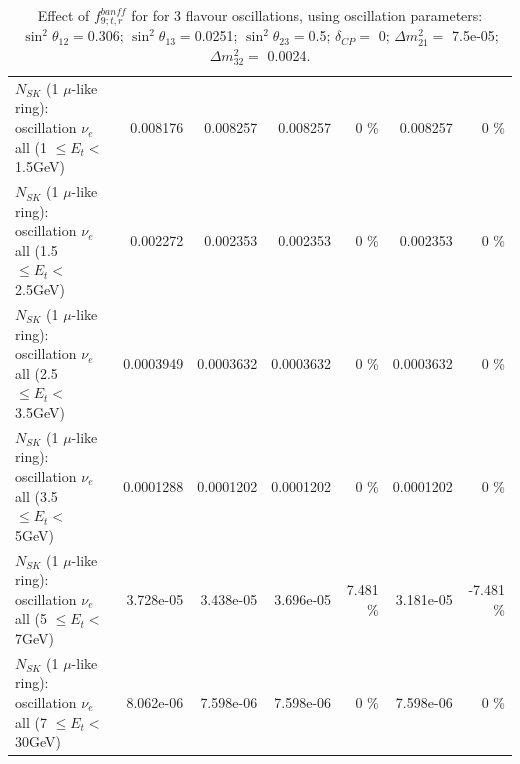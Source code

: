\begin{table}
\begin{tabular}{| l | r | r | r  r | r  r |}
$N_{SK}$ (1 $\mu$-like ring): oscillation $\nu_{e}$ all (1 $\leq E_{t} <$ 1.5GeV) &        0.008176 &        0.008257 &        0.008257 &        0 \%  &        0.008257 &        0 \%  \\ 
$N_{SK}$ (1 $\mu$-like ring): oscillation $\nu_{e}$ all (1.5 $\leq E_{t} <$ 2.5GeV) &        0.002272 &        0.002353 &        0.002353 &        0 \%  &        0.002353 &        0 \%  \\ 
$N_{SK}$ (1 $\mu$-like ring): oscillation $\nu_{e}$ all (2.5 $\leq E_{t} <$ 3.5GeV) &       0.0003949 &       0.0003632 &       0.0003632 &        0 \%  &       0.0003632 &        0 \%  \\ 
$N_{SK}$ (1 $\mu$-like ring): oscillation $\nu_{e}$ all (3.5 $\leq E_{t} <$ 5GeV) &       0.0001288 &       0.0001202 &       0.0001202 &        0 \%  &       0.0001202 &        0 \%  \\ 
 $N_{SK}$ (1 $\mu$-like ring): oscillation $\nu_{e}$ all (5 $\leq E_{t} <$ 7GeV) &       3.728e-05 &       3.438e-05 &       3.696e-05 &    7.481 \%  &       3.181e-05 &   -7.481 \%  \\ 
$N_{SK}$ (1 $\mu$-like ring): oscillation $\nu_{e}$ all (7 $\leq E_{t} <$ 30GeV) &       8.062e-06 &       7.598e-06 &       7.598e-06 &        0 \%  &       7.598e-06 &        0 \%  \\ 
\hline
\hline
\end{tabular}
\caption{ Effect of $f_{9; t, r}^{banff}$ for for 3 flavour oscillations, using oscillation parameters:  $\sin^2\theta_{12} = $0.306; $\sin^2\theta_{13} = $0.0251; $\sin^2\theta_{23} = $0.5; $\delta_{CP} = $        0; $\Delta m^2_{21} = $    7.5e-05; $\Delta m^2_{32} = $    0.0024. }
\label{tab:num_banff_09_1RmuT_3f_osc_t13:0.0251}
\end{table}
\clearpage
